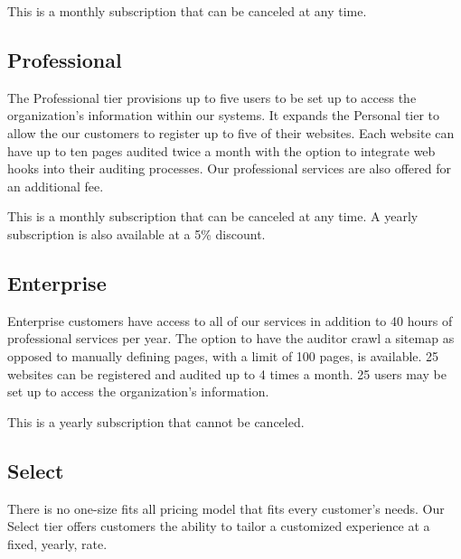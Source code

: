 This is a monthly subscription that can be canceled at any time.

\subsection{Professional}

The Professional tier provisions up to five users to be set up to access the organization's information within our systems. It expands the Personal tier to allow the our customers to register up to five of their websites. Each website can have up to ten pages audited twice a month with the option to integrate web hooks into their auditing processes. Our professional services are also offered for an additional fee.

This is a monthly subscription that can be canceled at any time. A yearly subscription is also available at a 5\% discount.

\subsection{Enterprise}

Enterprise customers have access to all of our services in addition to 40 hours of professional services per year. The option to have the auditor crawl a sitemap as opposed to manually defining pages, with a limit of 100 pages, is available. 25 websites can be registered and audited up to 4 times a month. 25 users may be set up to access the organization's information.

This is a yearly subscription that cannot be canceled.

\subsection{Select}

There is no one-size fits all pricing model that fits every customer's needs. Our Select tier offers customers the ability to tailor a customized experience at a fixed, yearly, rate.

